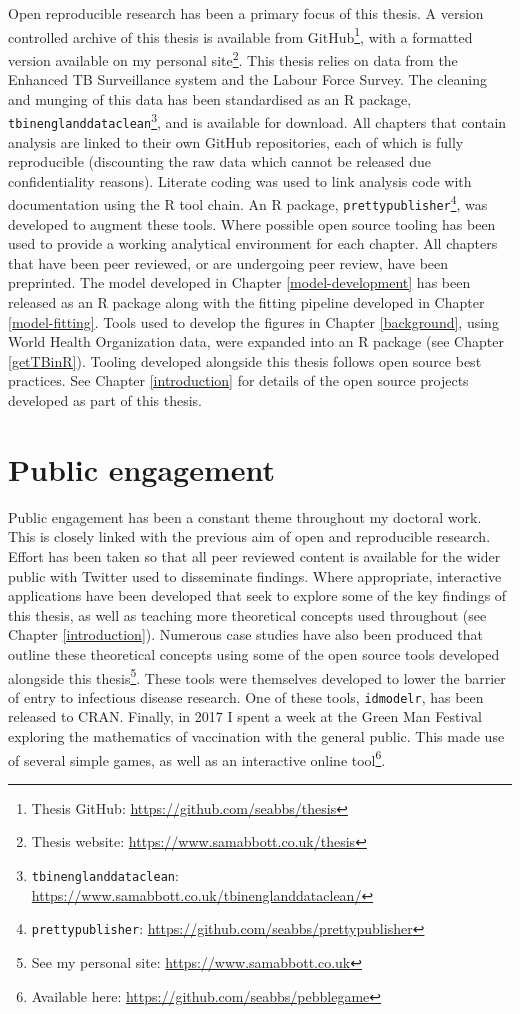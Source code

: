 \documentclass[11pt,twoside]{bristolthesis}
\begin{document}
  Open reproducible research has been a primary focus of this thesis. A version controlled archive of this thesis is available from GitHub\footnote{Thesis GitHub: \url{https://github.com/seabbs/thesis}}, with a formatted version available on my personal site\footnote{Thesis website: \url{https://www.samabbott.co.uk/thesis}}. This thesis relies on data from the Enhanced TB Surveillance system and the Labour Force Survey. The cleaning and munging of this data has been standardised as an R package, \texttt{tbinenglanddataclean}\footnote{\texttt{tbinenglanddataclean}: \url{https://www.samabbott.co.uk/tbinenglanddataclean/}}, and is available for download. All chapters that contain analysis are linked to their own GitHub repositories, each of which is fully reproducible (discounting the raw data which cannot be released due confidentiality reasons). Literate coding was used to link analysis code with documentation using the R tool chain. An R package, \texttt{prettypublisher}\footnote{\texttt{prettypublisher}: \url{https://github.com/seabbs/prettypublisher}}, was developed to augment these tools. Where possible open source tooling has been used to provide a working analytical environment for each chapter. All chapters that have been peer reviewed, or are undergoing peer review, have been preprinted. The model developed in Chapter \ref{model-development} has been released as an R package along with the fitting pipeline developed in Chapter \ref{model-fitting}. Tools used to develop the figures in Chapter \ref{background}, using World Health Organization data, were expanded into an R package (see Chapter \ref{getTBinR}). Tooling developed alongside this thesis follows open source best practices. See Chapter \ref{introduction} for details of the open source projects developed as part of this thesis.
  
  \hypertarget{public-engagement}{%
  \section{Public engagement}\label{public-engagement}}
  
  Public engagement has been a constant theme throughout my doctoral work. This is closely linked with the previous aim of open and reproducible research. Effort has been taken so that all peer reviewed content is available for the wider public with Twitter used to disseminate findings. Where appropriate, interactive applications have been developed that seek to explore some of the key findings of this thesis, as well as teaching more theoretical concepts used throughout (see Chapter \ref{introduction}). Numerous case studies have also been produced that outline these theoretical concepts using some of the open source tools developed alongside this thesis\footnote{See my personal site: \url{https://www.samabbott.co.uk}}. These tools were themselves developed to lower the barrier of entry to infectious disease research. One of these tools, \texttt{idmodelr}, has been released to CRAN. Finally, in 2017 I spent a week at the Green Man Festival exploring the mathematics of vaccination with the general public. This made use of several simple games, as well as an interactive online tool\footnote{Available here: \url{https://github.com/seabbs/pebblegame}}.
  
\end{document}
